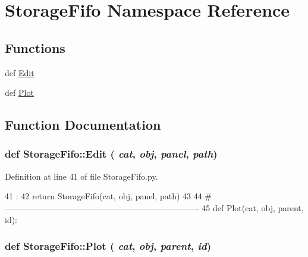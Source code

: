 \hypertarget{namespaceStorageFifo}{
\section{StorageFifo Namespace Reference}
\label{namespaceStorageFifo}
}
\subsection*{Functions}
\begin{DoxyCompactItemize}
\item 
def \hyperlink{namespaceStorageFifo_a5b6ecd4e73041e961b8135af80be2eb3}{Edit}
\item 
def \hyperlink{namespaceStorageFifo_afdf090528061f88730ce756d728b5e56}{Plot}
\end{DoxyCompactItemize}


\subsection{Function Documentation}
\hypertarget{namespaceStorageFifo_a5b6ecd4e73041e961b8135af80be2eb3}{
\subsubsection[{Edit}]{\setlength{\rightskip}{0pt plus 5cm}def StorageFifo::Edit ( {\em cat}, \/   {\em obj}, \/   {\em panel}, \/   {\em path})}}
\label{namespaceStorageFifo_a5b6ecd4e73041e961b8135af80be2eb3}


Definition at line 41 of file StorageFifo.py.


\begin{DoxyCode}
41                                 :
42     return StorageFifo(cat, obj, panel, path)
43 
44 #----------------------------------------------------------------------
45 
def Plot(cat, obj, parent, id):
\end{DoxyCode}
\hypertarget{namespaceStorageFifo_afdf090528061f88730ce756d728b5e56}{
\subsubsection[{Plot}]{\setlength{\rightskip}{0pt plus 5cm}def StorageFifo::Plot ( {\em cat}, \/   {\em obj}, \/   {\em parent}, \/   {\em id})}}
\label{namespaceStorageFifo_afdf090528061f88730ce756d728b5e56}


